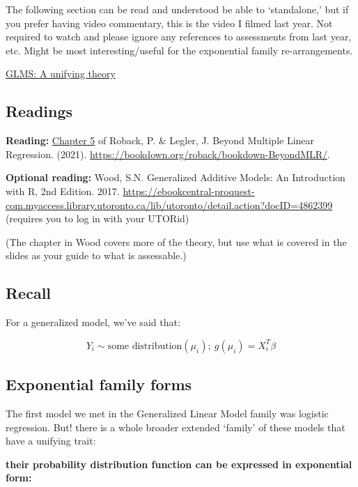 \documentclass[
  openany]{book}
\begin{document}
The following section can be read and understood be able to `standalone,' but if you prefer
having video commentary, this is the video I filmed last year. Not
required to watch and please ignore any references to assessments from
last year, etc. Might be most interesting/useful for the exponential family re-arrangements.

\href{https://play.library.utoronto.ca/watch/fe7ad273500e61254a66884818512fe0}{GLMS: A unifying theory}

\hypertarget{readings}{%
\subsection{Readings}\label{readings}}

\textbf{Reading:} \href{https://bookdown.org/roback/bookdown-BeyondMLR/ch-glms.html}{Chapter
5} of
Roback, P. \& Legler, J. Beyond Multiple Linear Regression. (2021).
\url{https://bookdown.org/roback/bookdown-BeyondMLR/}.

\textbf{Optional reading:} Wood, S.N. Generalized Additive Models: An
Introduction with R, 2nd Edition. 2017.
\url{https://ebookcentral-proquest-com.myaccess.library.utoronto.ca/lib/utoronto/detail.action?docID=4862399}
(requires you to log in with your UTORid)

(The chapter in Wood covers more of the theory, but use what is covered
in the slides as your guide to what is assessable.)

\hypertarget{recall}{%
\subsection{Recall}\label{recall}}

For a generalized model, we've said that:

\[Y_i \sim  \text{some distribution}(\mu_i);\ g(\mu_i) =  X_i^T\beta\]

\hypertarget{exponential-family-forms}{%
\subsection{Exponential family forms}\label{exponential-family-forms}}

The first model we met in the Generalized Linear Model family was
logistic regression. But! there is a whole broader extended `family' of
these models that have a unifying trait:

\textbf{their probability distribution function can be expressed in
exponential form:}
\end{document}
